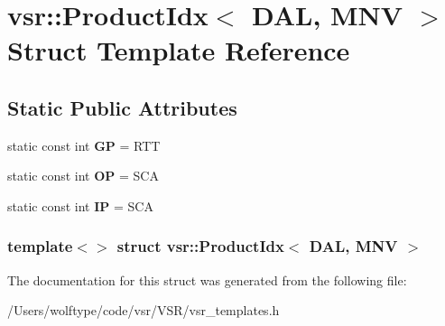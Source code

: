 \hypertarget{structvsr_1_1_product_idx_3_01_d_a_l_00_01_m_n_v_01_4}{\section{vsr\-:\-:Product\-Idx$<$ D\-A\-L, M\-N\-V $>$ Struct Template Reference}
\label{structvsr_1_1_product_idx_3_01_d_a_l_00_01_m_n_v_01_4}
}
\subsection*{Static Public Attributes}
\begin{DoxyCompactItemize}
\item 
\hypertarget{structvsr_1_1_product_idx_3_01_d_a_l_00_01_m_n_v_01_4_a5704f28bc2d9accb3890967320acb643}{static const int {\bfseries G\-P} = R\-T\-T}\label{structvsr_1_1_product_idx_3_01_d_a_l_00_01_m_n_v_01_4_a5704f28bc2d9accb3890967320acb643}

\item 
\hypertarget{structvsr_1_1_product_idx_3_01_d_a_l_00_01_m_n_v_01_4_a303b44ef312ba7c04b2375aba5ce4a76}{static const int {\bfseries O\-P} = S\-C\-A}\label{structvsr_1_1_product_idx_3_01_d_a_l_00_01_m_n_v_01_4_a303b44ef312ba7c04b2375aba5ce4a76}

\item 
\hypertarget{structvsr_1_1_product_idx_3_01_d_a_l_00_01_m_n_v_01_4_a62b587f14d60d0b61a97e281d3757750}{static const int {\bfseries I\-P} = S\-C\-A}\label{structvsr_1_1_product_idx_3_01_d_a_l_00_01_m_n_v_01_4_a62b587f14d60d0b61a97e281d3757750}

\end{DoxyCompactItemize}
\subsubsection*{template$<$$>$ struct vsr\-::\-Product\-Idx$<$ D\-A\-L, M\-N\-V $>$}



The documentation for this struct was generated from the following file\-:\begin{DoxyCompactItemize}
\item 
/\-Users/wolftype/code/vsr/\-V\-S\-R/vsr\-\_\-templates.\-h\end{DoxyCompactItemize}
